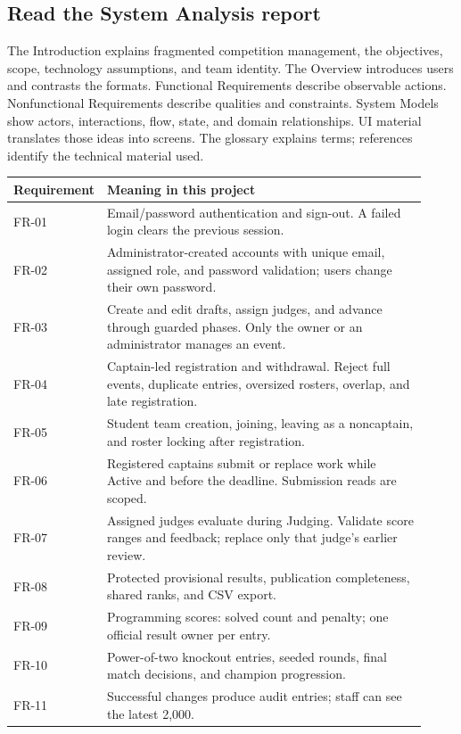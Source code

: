 \documentclass[12pt]{article}
\begin{document}
\subsection{Read the System Analysis report}
The Introduction explains fragmented competition management, the objectives, scope, technology assumptions, and team identity. The Overview introduces users and contrasts the formats. Functional Requirements describe observable actions. Nonfunctional Requirements describe qualities and constraints. System Models show actors, interactions, flow, state, and domain relationships. UI material translates those ideas into screens. The glossary explains terms; references identify the technical material used.

\begin{longtable}{p{0.14\linewidth}p{0.78\linewidth}}\toprule Requirement & Meaning in this project\\\midrule\endhead
FR-01 & Email/password authentication and sign-out. A failed login clears the previous session.\\
FR-02 & Administrator-created accounts with unique email, assigned role, and password validation; users change their own password.\\
FR-03 & Create and edit drafts, assign judges, and advance through guarded phases. Only the owner or an administrator manages an event.\\
FR-04 & Captain-led registration and withdrawal. Reject full events, duplicate entries, oversized rosters, overlap, and late registration.\\
FR-05 & Student team creation, joining, leaving as a noncaptain, and roster locking after registration.\\
FR-06 & Registered captains submit or replace work while Active and before the deadline. Submission reads are scoped.\\
FR-07 & Assigned judges evaluate during Judging. Validate score ranges and feedback; replace only that judge's earlier review.\\
FR-08 & Protected provisional results, publication completeness, shared ranks, and CSV export.\\
FR-09 & Programming scores: solved count and penalty; one official result owner per entry.\\
FR-10 & Power-of-two knockout entries, seeded rounds, final match decisions, and champion progression.\\
FR-11 & Successful changes produce audit entries; staff can see the latest 2,000.\\\bottomrule
\end{longtable}
\end{document}
